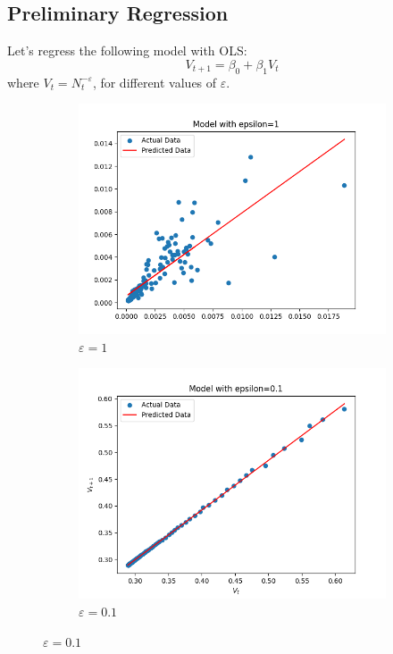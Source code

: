     \subsection{Preliminary Regression}
    Let's regress the following model with OLS:
    \begin{equation}
        V_{t+1} = \beta_0 + \beta_1 V_t
    \end{equation}
    where $V_t=N_t^{-\varepsilon}$, for different values of $\varepsilon$.

    \begin{figure}[h!]
        \centering
        \begin{subfigure}[b]{0.3\textwidth}
            \includegraphics[width=.8\linewidth]{plots/epsilon_1}
            \caption{$\varepsilon = 1$}
        \end{subfigure} \quad
        \begin{subfigure}[b]{0.3\textwidth}
            \includegraphics[width=.8\linewidth]{plots/epsilon_0.1}
            \caption{$\varepsilon = 0.1$}
        \end{subfigure} \quad

\end{figure}
